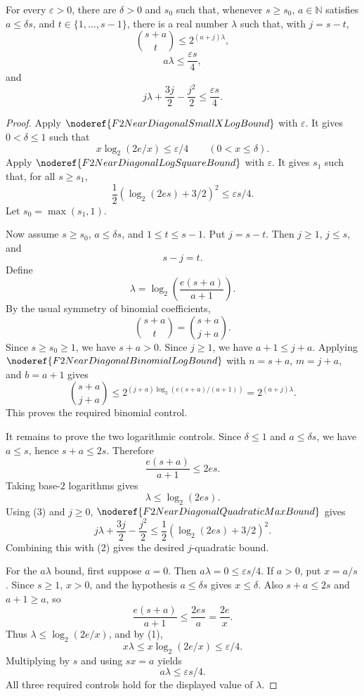 \begin{helper}
For every \(\varepsilon>0\), there are \(\delta>0\) and \(s_0\) such
that, whenever \(s\ge s_0\), \(a\in\mathbb N\) satisfies
\(a\le\delta s\), and \(t\in\{1,\ldots,s-1\}\), there is a real number
\(\lambda\) such that, with \(j=s-t\),
\[
  \binom{s+a}{t}\le 2^{(a+j)\lambda},
\]
\[
  a\lambda\le \frac{\varepsilon s}{4},
\]
and
\[
  j\lambda+\frac{3j}{2}-\frac{j^2}{2}\le \frac{\varepsilon s}{4}.
\]
\end{helper}
\begin{proof}
Apply \(\noderef{F2NearDiagonalSmallXLogBound}\) with \(\varepsilon\).  It
gives \(0<\delta\le1\) such that
\[
  x\log_2(2e/x)\le\varepsilon/4
  \qquad(0<x\le\delta). \tag{1}
\]
Apply \(\noderef{F2NearDiagonalLogSquareBound}\) with \(\varepsilon\).  It
gives \(s_1\) such that, for all \(s\ge s_1\),
\[
  \frac12(\log_2(2es)+3/2)^2\le\varepsilon s/4. \tag{2}
\]
Let \(s_0=\max(s_1,1)\).

Now assume \(s\ge s_0\), \(a\le\delta s\), and
\(1\le t\le s-1\).  Put \(j=s-t\).  Then \(j\ge1\), \(j\le s\), and
\[
  s-j=t.
\]
Define
\[
  \lambda=\log_2\left(\frac{e(s+a)}{a+1}\right).
\]
By the usual symmetry of binomial coefficients,
\[
  \binom{s+a}{t}=\binom{s+a}{j+a}.
\]
Since \(s\ge s_0\ge1\), we have \(s+a>0\).  Since \(j\ge1\), we have
\(a+1\le j+a\).  Applying
\(\noderef{F2NearDiagonalBinomialLogBound}\) with
\(n=s+a\), \(m=j+a\), and \(b=a+1\) gives
\[
  \binom{s+a}{j+a}
  \le
  2^{(j+a)\log_2(e(s+a)/(a+1))}
  =
  2^{(a+j)\lambda}.
\]
This proves the required binomial control.

It remains to prove the two logarithmic controls.  Since \(\delta\le1\) and
\(a\le\delta s\), we have \(a\le s\), hence \(s+a\le2s\).  Therefore
\[
  \frac{e(s+a)}{a+1}\le 2es.
\]
Taking base-\(2\) logarithms gives
\[
  \lambda\le \log_2(2es). \tag{3}
\]
Using (3) and \(j\ge0\), \(\noderef{F2NearDiagonalQuadraticMaxBound}\)
gives
\[
  j\lambda+\frac{3j}{2}-\frac{j^2}{2}
  \le \frac12(\log_2(2es)+3/2)^2.
\]
Combining this with (2) gives the desired \(j\)-quadratic bound.

For the \(a\lambda\) bound, first suppose \(a=0\).  Then
\(a\lambda=0\le\varepsilon s/4\).  If \(a>0\), put \(x=a/s\).  Since
\(s\ge1\), \(x>0\), and the hypothesis \(a\le\delta s\) gives
\(x\le\delta\).  Also \(s+a\le2s\) and \(a+1\ge a\), so
\[
  \frac{e(s+a)}{a+1}
  \le \frac{2es}{a}
  =
  \frac{2e}{x}.
\]
Thus \(\lambda\le\log_2(2e/x)\), and by (1),
\[
  x\lambda\le x\log_2(2e/x)\le\varepsilon/4.
\]
Multiplying by \(s\) and using \(sx=a\) yields
\[
  a\lambda\le \varepsilon s/4.
\]
All three required controls hold for the displayed value of \(\lambda\).
\end{proof}
